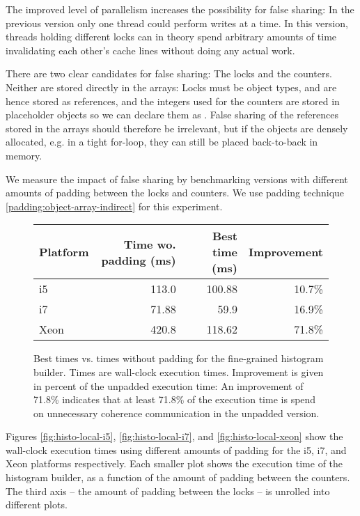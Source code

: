 The improved level of parallelism increases the possibility for false sharing: In
the previous version only one thread could perform writes at a time. In this
version, threads holding different locks can in theory spend arbitrary amounts
of time invalidating each other's cache lines without doing any actual work.

There are two clear candidates for false sharing: The locks and the counters.
Neither are stored directly in the arrays: Locks must be object types, and are
hence stored as references, and the integers used for the counters are stored in
placeholder objects so we can declare them as . False sharing of
the references stored in the arrays should therefore be irrelevant, but if the
objects are densely allocated, e.g. in a tight for-loop, they can still be
placed back-to-back in memory.

We measure the impact of false sharing by benchmarking versions with different
amounts of padding between the locks and counters. We use padding technique
\ref{padding:object-array-indirect} for this experiment.

\begin{figure}[hbtp]
	\centering
	\begin{tabular}{l r r r}
		\hline
		\hline
		Platform & Time wo. padding (ms) & Best time (ms) & Improvement \\
		\hline
		i5 & 113.0 & 100.88 & 10.7\% \\
		i7 & 71.88 & 59.9 & 16.9\% \\
		Xeon & 420.8 & 118.62 & 71.8\% \\
		\hline
		\hline
	\end{tabular}
	\caption{Best times vs. times without padding for the fine-grained
	histogram builder. Times are wall-clock execution times. Improvement is
	given in percent of the unpadded execution time: An improvement of
	71.8\% indicates that at least 71.8\% of the execution time is spend on
	unnecessary coherence communication in the unpadded version.}
	\label{table:hist-local}
\end{figure}

Figures \ref{fig:histo-local-i5}, \ref{fig:histo-local-i7}, and
\ref{fig:histo-local-xeon} show the wall-clock execution times using different
amounts of padding for the i5, i7, and Xeon platforms respectively. Each smaller
plot shows the execution time of the histogram builder, as a function of the
amount of padding between the counters. The third axis -- the amount of padding
between the locks -- is unrolled into different plots.

